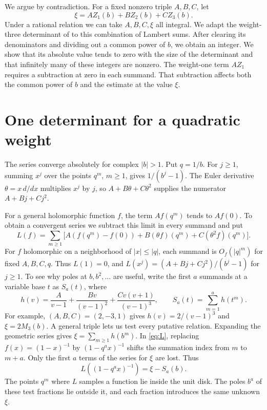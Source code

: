 \documentclass[11pt]{article}
\begin{document}
We argue by contradiction. For a fixed nonzero triple \(A,B,C\), let
\[
                   \xi=A Z_1(b)+B Z_2(b)+C Z_3(b).
\]
Under a rational relation we can take \(A,B,C,\xi\) all integral.
We adapt the weight-three determinant of \cite[\S\S1--2]{Uplift} to
this combination of Lambert sums. After clearing its denominators and
dividing out a common power of \(b\), we obtain an integer. We show
that its absolute value tends to zero with the size of the determinant
and that infinitely many of these integers are nonzero. The weight-one
term \(AZ_1\) requires a subtraction at zero in each summand. That
subtraction affects both the common power of \(b\) and the estimate
at the value \(\xi\).

\section{One determinant for a quadratic weight}

The series converge absolutely for complex \(|b|>1\). Put \(q=1/b\).
For \(j\ge1\), summing \(x^j\) over the points \(q^m\), \(m\ge1\),
gives \(1/(b^j-1)\). The Euler derivative \(\theta=x\,d/dx\)
multiplies \(x^j\) by \(j\), so \(A+B\theta+C\theta^2\) supplies
the numerator \(A+Bj+Cj^2\).

For a general holomorphic function \(f\), the term \(Af(q^m)\)
tends to \(Af(0)\). To obtain a convergent series we subtract
this limit in every summand and put
\begin{equation}\label{eq:L}
 L(f)=\sum_{m\ge1}
 \bigl[A(f(q^m)-f(0))+B(\theta f)(q^m)+C(\theta^2f)(q^m)\bigr].
\end{equation}
For \(f\) holomorphic on a neighborhood of \(|x|\le |q|\), each
summand is \(O_f(|q|^m)\) for fixed \(A,B,C,q\).
Thus \(L(1)=0\), and \(L(x^j)=(A+Bj+Cj^2)/(b^j-1)\) for \(j\ge1\).
To see why poles at \(b,b^2,\ldots\) are useful, write the first
\(a\) summands at a variable base \(t\) as \(S_a(t)\), where
\[
 h(v)=\frac{A}{v-1}+\frac{Bv}{(v-1)^2}
                +\frac{Cv(v+1)}{(v-1)^3},\qquad
 S_a(t)=\sum_{m=1}^a h(t^m).
\]
For example, \((A,B,C)=(2,-3,1)\) gives \(h(v)=2/(v-1)^3\)
and \(\xi=2M_3(b)\). A general triple lets us test every putative relation.
Expanding the geometric series gives \(\xi=\sum_{m\ge1}h(b^m)\).
In \eqref{eq:L}, replacing \(f(x)=(1-x)^{-1}\) by
\((1-q^a x)^{-1}\) shifts the summation index from \(m\) to \(m+a\).
Only the first \(a\) terms of the series for \(\xi\) are lost. Thus
\[
                   L((1-q^a x)^{-1})=\xi-S_a(b).
\]
The points \(q^m\) where \(L\) samples a function lie inside the unit
disk. The poles \(b^a\) of these test fractions lie outside it, and
each fraction introduces the same unknown \(\xi\).
\end{document}
